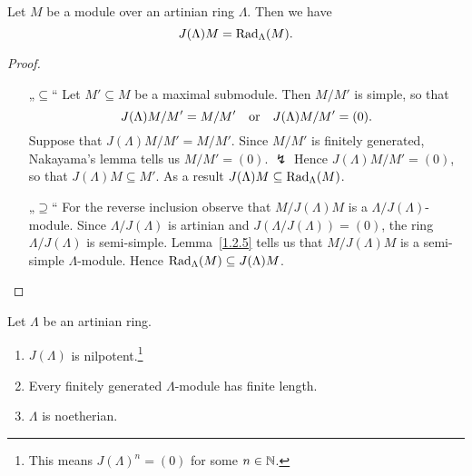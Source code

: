 %




\begin{corollary}\label{1.2.6}
Let $M$ be a module over an artinian ring $\Lambda$. Then we have
\[
J(\Lambda)M = \operatorname{Rad}_\Lambda(M).
\]
\end{corollary}


\begin{proof}\
\begin{itemize}
\item[„$\subseteq$“] Let $M'\subseteq M$ be a maximal submodule. Then $M/M'$ is simple, so that 
\[
J(\Lambda) M/M' = M/M'
\quad\text{or}\quad
J(\Lambda) M/M' = (0).
\]
Suppose that $J(\Lambda) M/M' = M/M'$. Since $M/M'$ is finitely generated, Nakayama's lemma tells us $M/M'=(0)$. $\lightning$ Hence $J(\Lambda) M/M' = (0)$, so that $J(\Lambda)M\subseteq M'$. As a result $J(\Lambda)M\subseteq \operatorname{Rad}_\Lambda(M)$. 

\item[„$\supseteq$“] For the reverse inclusion observe that $M/J(\Lambda) M$ is a $\Lambda/J(\Lambda)$-module. Since $\Lambda/J(\Lambda)$ is artinian and $J(\Lambda/J(\Lambda))=(0)$, the ring $\Lambda/J(\Lambda)$ is semi-simple. Lemma~\ref{1.2.5} tells us that $M/J(\Lambda) M$ is a semi-simple $\Lambda$-module. Hence $\operatorname{Rad}_\Lambda(M)\subseteq J(\Lambda)M$.\qedhere
\end{itemize}
\end{proof}


\begin{theorem}\label{1.2.7}
Let $\Lambda$ be an artinian ring.
\begin{enumerate}
\item $J(\Lambda)$ is nilpotent.\footnote{This  means $J(\Lambda)^n=(0)$ for some $n\in\mathbb{N}$.}
\item Every finitely generated $\Lambda$-module has finite length.
\item $\Lambda$ is noetherian.
\end{enumerate}
\end{theorem}

